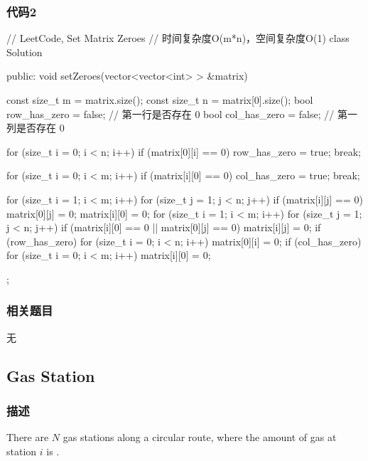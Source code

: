 \subsubsection{代码2}
\begin{Code}
// LeetCode, Set Matrix Zeroes
// 时间复杂度O(m*n)，空间复杂度O(1)
class Solution {
public:
    void setZeroes(vector<vector<int> > &matrix) {
        const size_t m = matrix.size();
        const size_t n = matrix[0].size();
        bool row_has_zero = false; // 第一行是否存在 0
        bool col_has_zero = false; // 第一列是否存在 0

        for (size_t i = 0; i < n; i++)
            if (matrix[0][i] == 0) {
                row_has_zero = true;
                break;
            }

        for (size_t i = 0; i < m; i++)
            if (matrix[i][0] == 0) {
                col_has_zero = true;
                break;
            }

        for (size_t i = 1; i < m; i++)
            for (size_t j = 1; j < n; j++)
                if (matrix[i][j] == 0) {
                    matrix[0][j] = 0;
                    matrix[i][0] = 0;
                }
        for (size_t i = 1; i < m; i++)
            for (size_t j = 1; j < n; j++)
                if (matrix[i][0] == 0 || matrix[0][j] == 0)
                    matrix[i][j] = 0;
        if (row_has_zero)
            for (size_t i = 0; i < n; i++)
                matrix[0][i] = 0;
        if (col_has_zero)
            for (size_t i = 0; i < m; i++)
                matrix[i][0] = 0;
    }
};
\end{Code}


\subsubsection{相关题目}
\begindot
\item 无
\myenddot


\subsection{Gas Station} %
\label{sec:gas-station}


\subsubsection{描述}
There are $N$ gas stations along a circular route, where the amount of gas at station $i$ is .

